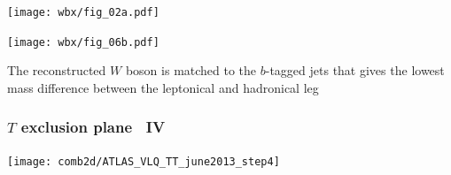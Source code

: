 \documentclass[xcolor=dvipsnames,10pt]{beamer}
\begin{document}
\begin{frame}
\begin{minipage}{.65\textwidth}
\begin{minipage}{.55\textwidth}
     \texttt{[image: wbx/fig\_02a.pdf]}

  \end{minipage}

%


    \end{minipage}\begin{minipage}{.35\textwidth}
\centering\scriptsize

      \texttt{[image: wbx/fig\_06b.pdf]}

The reconstructed $W$ boson is matched to the $b$-tagged jets that gives the lowest mass difference between the leptonical and hadronical leg
    \end{minipage}

\end{frame}

\begin{frame}\frametitle{$T$ exclusion plane~\cite{combination} IV}
\footnotesize\centering

\texttt{[image: comb2d/ATLAS\_VLQ\_TT\_june2013\_step4]}

\end{frame}



\end{document}
